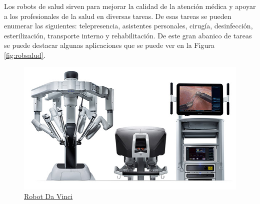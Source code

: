 Los robots de salud sirven para mejorar la calidad de la atención médica y apoyar a los profesionales de la salud en diversas tareas. De esas tareas se pueden enumerar las siguientes: telepresencia, asistentes personales, cirugía, desinfección, esterilización, transporte interno y rehabilitación. De este gran abanico de tareas se puede destacar algunas aplicaciones que se puede ver en la Figura \ref{fig:robsalud}.\\

\begin{figure}[ht!]
	\centering
	\begin{minipage}{0.5\linewidth}
		\centering
		\includegraphics[width=\linewidth]{figs/davincimed.png}
		\caption*{\centering\href{https://www.abexsl.es/es/sistema-robotico-da-vinci/que-es}{Robot Da Vinci}}
	\end{minipage}
    \hspace{1 cm}
	\begin{minipage}{0.15\linewidth}
		\centering

\end{minipage}
\end{figure}
